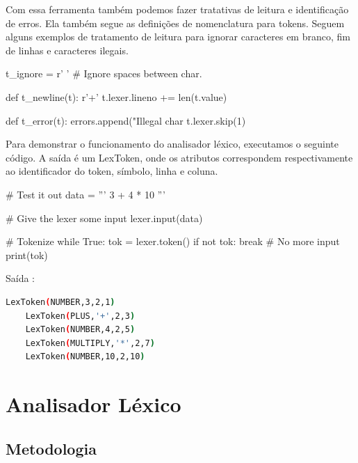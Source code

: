 \documentclass[
	12pt,				%
	openright,			%
	twoside,			%
	a4paper,			%
	english,			%
	french,				%
	spanish,			%
	brazil				%
	]{abntex2}
\begin{document}
Com essa ferramenta também podemos fazer tratativas de leitura e identificação de erros.
Ela também segue as definições de nomenclatura para tokens. Seguem alguns exemplos
de tratamento de leitura para ignorar caracteres em branco, fim de linhas e caracteres ilegais.
\begin{python}
t_ignore = r' ' # Ignore spaces between char.

def t_newline(t):
	r'\n+'
	t.lexer.lineno += len(t.value)

def t_error(t):
    errors.append("Illegal char %
    t.lexer.skip(1)

\end{python}

Para demonstrar o funcionamento do analisador léxico, executamos o seguinte
código. A saída é um LexToken, onde os atributos correspondem respectivamente ao 
identificador do token, símbolo, linha e coluna.

\begin{python}
# Test it out
data = '''
3 + 4 * 10
'''

# Give the lexer some input
lexer.input(data)

# Tokenize
while True:
    tok = lexer.token()
    if not tok:
        break      # No more input
    print(tok)
\end{python}
\noindent Saída :
\begin{lstlisting}[language=bash]
    LexToken(NUMBER,3,2,1)
    LexToken(PLUS,'+',2,3)
    LexToken(NUMBER,4,2,5)
    LexToken(MULTIPLY,'*',2,7)
    LexToken(NUMBER,10,2,10)

\end{lstlisting}


\part{Analisador Léxico}

\chapter{Metodologia}
\end{document}
